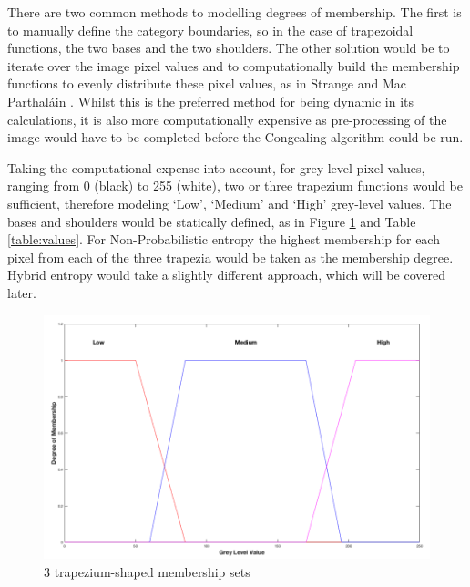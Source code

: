 There are two common methods to modelling degrees of membership. The first is to manually define the category boundaries, so in the case of trapezoidal functions, the two bases and the two shoulders. The other solution would be to iterate over the image pixel values and to computationally build the membership functions to evenly distribute these pixel values, as in Strange and Mac Parthal\'ain \cite{Mac_Parthalain_Strange_2013}. Whilst this is the preferred method for being dynamic in its calculations, it is also more computationally expensive as pre-processing of the image would have to be completed before the \Gls{Congealing} algorithm could be run.

Taking the computational expense into account, for grey-level pixel values, ranging from 0 (black) to 255 (white), two or three trapezium functions would be sufficient, therefore modeling `Low', `Medium' and `High' grey-level values. The bases and shoulders would be statically defined, as in Figure \ref{fig:3-trapeziums} and Table \ref{table:values}. For Non-Probabilistic entropy the highest membership for each pixel from each of the three trapezia would be taken as the membership degree. Hybrid entropy would take a slightly different approach, which will be covered later.

\begin{figure}[H]
  \center
  \includegraphics[scale=0.4]{Chapter2/hybrid-img/3_traps.png}
  \caption{3 trapezium-shaped membership sets}
  \label{fig:3-trapeziums}
\end{figure}

